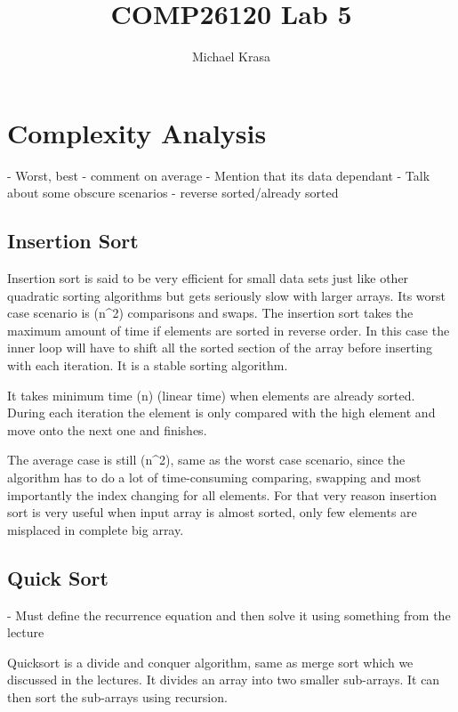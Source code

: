 \documentclass{article}
\title{COMP26120 Lab 5}
\author{Michael Krasa}
\begin{document}
\maketitle


\section{Complexity Analysis}
\label{sec:complexity}

- Worst, best - comment on average
- Mention that its data dependant
- Talk about some obscure scenarios - reverse sorted/already sorted


\subsection{Insertion Sort}

Insertion sort is said to be very efficient for small data sets just like other quadratic sorting algorithms but gets seriously slow with larger arrays. Its worst case scenario is \theta(n^2) comparisons and swaps. The insertion sort takes the maximum amount of time if elements are sorted in reverse order. In this case the inner loop will have to shift all the sorted section of the array before inserting with each iteration. It is a stable sorting algorithm.

It takes minimum time \theta(n) (linear time) when elements are already sorted. During each iteration the element is only compared with the high element and move onto the next one and finishes.

The average case is still \theta(n^2), same as the worst case scenario, since the algorithm has to do a lot of time-consuming comparing, swapping and most importantly the index changing for all elements. For that very reason insertion sort is very useful when input array is almost sorted, only few elements are misplaced in complete big array. 



\subsection{Quick Sort}

- Must define the recurrence equation and then solve it using something from the lecture

Quicksort is a divide and conquer algorithm, same as merge sort which we discussed in the lectures. It divides an array into two smaller sub-arrays. It can then sort the sub-arrays using recursion. 
\end{document}
